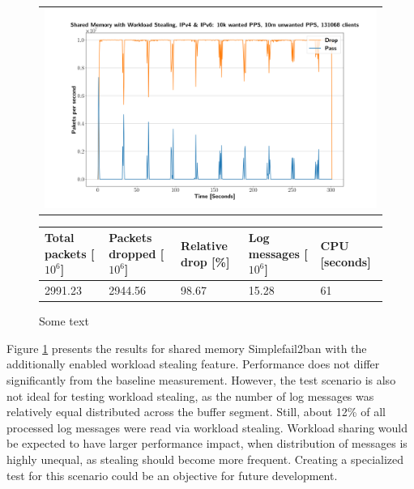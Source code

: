 \begin{figure}[!h]
	\centering
	\scriptsize
	\begin{tabular}{c}
    	\centerline{\includegraphics[width=1.2\textwidth]{images/simplefail2ban_shm_ws_ipv46_v10k_iv10m_c131068.png}}
	\end{tabular}
	\begin{tabular}{lllll}
		\toprule
		\textbf{Total packets [$10^6$]} & \textbf{Packets dropped [$10^6$]} & \textbf{Relative drop [\%]} & \textbf{Log messages [$10^6$]} & \textbf{CPU [seconds]} \\ \midrule 
		2991.23 & 2944.56 & 98.67 & 15.28 & 61 \\
		\bottomrule
	\end{tabular}
	\caption[Simplefail2ban, Shared Memory with Workload Sharing]{Some text}
	\label{fig:simplefail2ban:shm:ws}
\end{figure}

Figure \ref{fig:simplefail2ban:shm:ws} presents the results for shared memory Simplefail2ban with the additionally enabled workload stealing feature. Performance does not differ significantly from the baseline measurement. However,
the test scenario is also not ideal for testing workload stealing, as the number of log messages was relatively equal distributed across the buffer segment. Still, about 12\% of all processed log messages were
read via workload stealing. Workload sharing would be expected to have 
larger performance impact, when distribution of messages is highly unequal, as stealing should become more frequent. Creating a specialized test for this scenario could be an objective for future development. 

\pagebreak

